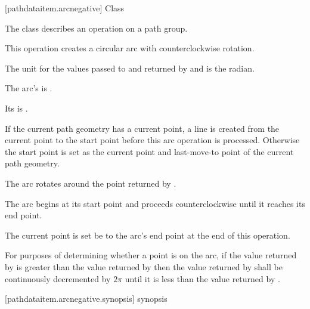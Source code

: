  [pathdataitem.arcnegative] {Class }

\pnum
{}
The class  describes an operation on a path group.

\pnum
This operation creates a circular arc with counterclockwise rotation.

\pnum
The unit for the values passed to and returned by  and  is the radian.

\pnum
The arc's  is .

\pnum
Its  is .

\pnum
If the current path geometry has a current point, a line is created from the current point to the start point before this arc operation is processed. Otherwise the start point is set as the current point and last-move-to point of the current path geometry.

\pnum
The arc rotates around the point returned by .

\pnum
The arc begins at its start point and proceeds counterclockwise until it reaches its end point.

\pnum
The current point is set be to the arc's end point at the end of this operation.

\pnum
For purposes of determining whether a point is on the arc, if the value returned by  is greater than the value returned by  then the value returned by  shall be continuously decremented by $2\pi$ until it is less than the value returned by .

 [pathdataitem.arcnegative.synopsis] { synopsis}

